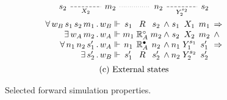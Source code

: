 \documentclass[sigplan,screen,review]{acmart}
\newcommand{\que}{\circ}
\newcommand{\ans}{\bullet}
\begin{document}
\begin{figure}
\[\begin{array}{c}
\begin{tikzcd}[sep=large,baseline=-3pt]
        s_2 \ar[r, "X_2"', dash, dashed] &
        m_2 \ar[r, dotted, dash] &
        n_2 \ar[r, "Y_2^{s_2}"', dash, dashed] &
        s_2
      \end{tikzcd}
      \vspace{0.5ex} \\
      \begin{array}{
          r @{\,.\,} l @{{} \Vdash {}} c@{}c@{}c @{\:\wedge\:}
                                    c@{}c@{}c @{\:\:} l}
        \forall \, w_B \, s_1 \, s_2 \, m_1 & w_B & s_1 & {}\mathrel{R}{} & s_2 &
                        s_1 & {}\mathrel{X_1}{} & m_1 & \Rightarrow \\
        \exists \, w_A \, m_2 & w_A & m_1 & {}\mathrel{\mathbb{R}_A^\que}{} & m_2 &
                        s_2 & {}\mathrel{X_2}{} & m_2 & \wedge \\
        \forall \, n_1 \, n_2 \, s_1' & w_A & n_1 & {}\mathrel{\mathbb{R}_A^\ans}{} & n_2 &
                        n_1 & {}\mathrel{Y_1^{s_1}}{} & s_1' & \Rightarrow \\
        \exists \, s_2' & w_B & s_1' & {}\mathrel{R}{} & s_2' &
                        n_2 & {}\mathrel{Y_2^{s_2}}{} & s_2' &
      \end{array}
      \vspace{1.2ex} \\
      \text{(c) External states}
    \end{array}
  \]
  \caption{Selected forward simulation properties.}
  \label{fig:fsim}
\end{figure}
\end{document}
